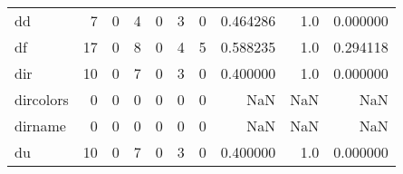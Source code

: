 \begin{longtable}{lrrrrrrrrr}
dd        &                                                  7 &                                                  0 &                                                  4 &                                                  0 &                                                  3 &                                                  0 &                                           0.464286 &                                    1.0 &                             0.000000 \\
df        &                                                 17 &                                                  0 &                                                  8 &                                                  0 &                                                  4 &                                                  5 &                                           0.588235 &                                    1.0 &                             0.294118 \\
dir       &                                                 10 &                                                  0 &                                                  7 &                                                  0 &                                                  3 &                                                  0 &                                           0.400000 &                                    1.0 &                             0.000000 \\
dircolors &                                                  0 &                                                  0 &                                                  0 &                                                  0 &                                                  0 &                                                  0 &                                                NaN &                                    NaN &                                  NaN \\
dirname   &                                                  0 &                                                  0 &                                                  0 &                                                  0 &                                                  0 &                                                  0 &                                                NaN &                                    NaN &                                  NaN \\
du        &                                                 10 &                                                  0 &                                                  7 &                                                  0 &                                                  3 &                                                  0 &                                           0.400000 &                                    1.0 &                             0.000000 \\

\end{longtable}
